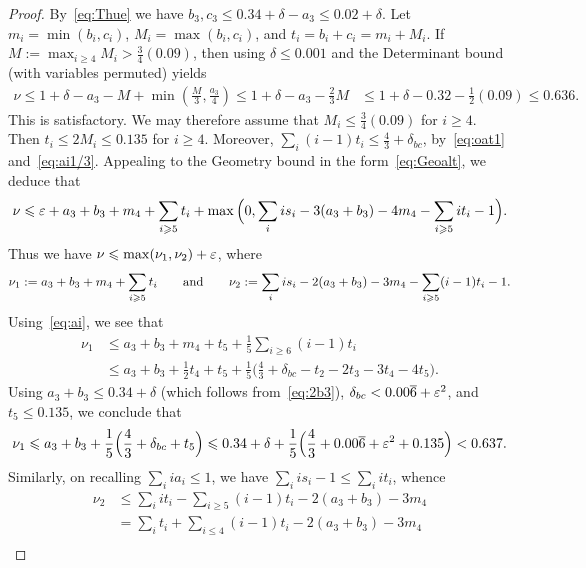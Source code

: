 \begin{proof}

  By~\eqref{eq:Thue} we have $b_3,c_3\le 0.34+\delta-a_3\le 0.02+\delta$.
  Let $m_i=\min(b_i,c_i)$, $M_i=\max(b_i,c_i)$, and $t_i=b_i+c_i=m_i+M_i$.
  If $M :=\max_{i\ge4}M_i > \frac{3}{4}(0.09)$, then using $\delta\leq 0.001$ and the Determinant bound (with variables permuted) yields
  \begin{align*}
  \nu \le 1 +\delta- a_3 - M + \min\left(\frac{M}{3}, \frac{a_3}{4}\right)
  \le 1+\delta - a_3 - \frac{2}{3}M
  &\le 1+\delta-0.32 - \frac{1}{2}(0.09) \le 0.636.
  \end{align*}
  This is satisfactory.
  We may therefore assume that $M_i\le \frac{3}{4}(0.09)$ for $i\ge4$. Then $t_i\le 2M_i\le 0.135$ for $i\ge4$.
  Moreover, $\sum_{i}(i-1)t_i \le \frac{4}{3}+\delta_{bc}$, by~\eqref{eq:oat1}
  and~\eqref{eq:ai1/3}.
  Appealing to the Geometry bound in the form~\eqref{eq:Geoalt}, we deduce that
  \begin{align*}
  \nu \le \eps + a_3+b_3 + m_4+\sum_{i\ge5}t_i + \max\Big(0 , \sum_i is_i - 3(a_3+b_3) - 4m_4-\sum_{i\ge5}it_i - 1\Big).
  \end{align*}
  Thus we have $\nu \le \max(\nu_1,\nu_2)+\eps$, where
  \begin{align*}
  \nu_1 := a_3+b_3 + m_4+\sum_{i\ge5}t_i
  \qquad{\rm and}\qquad
  \nu_2
  := \sum_i is_i -2(a_3+b_3) - 3m_4 - \sum_{i\ge5}(i-1)t_i -1.
  \end{align*}
  Using~\eqref{eq:ai}, we see that
  \begin{align*}
  \nu_1 &\le a_3+b_3 +m_4+t_5+\frac{1}{5}\sum_{i\ge6}(i-1)t_i\\
  & \le a_3 + b_3 + \frac{1}{2}t_4+t_5+\frac{1}{5}\Big(\frac{4}{3}+\delta_{bc}-t_2-2t_3- 3t_4-4t_5\Big).
  \end{align*}
  Using $a_3+b_3\le 0.34+\delta$ (which follows from~\eqref{eq:2b3}), $\delta_{bc}<0.00\overline{6}+\eps^2$, and $t_5\le 0.135$, we conclude that
  \[
  \nu_1 \le a_3+b_3 + \frac{1}{5}\Big(\frac{4}{3}+\delta_{bc}+t_5\Big)
  \le 0.34+ \delta + \frac{1}{5}\Big(\frac{4}{3}+0.00\overline{6}+\eps^2+0.135\Big) < 0.637.
  \]
  Similarly, on recalling $\sum_i i a_i \le 1$, we have $\sum_i is_i -1 \le \sum_i it_i$, whence
  \begin{align*}
  \nu_2
  &\le \sum_i it_i - \sum_{i\ge5}(i-1)t_i -2(a_3+b_3) - 3m_4\\
  &= \sum_{i} t_i + \sum_{i\le4}(i-1)t_i -2(a_3+b_3) - 3m_4\\

\end{align*}
\end{proof}
